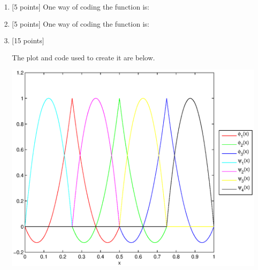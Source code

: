 \begin{solution}
\begin{enumerate}
\item {[5 points]} 
One way of coding the function is:



\item {[5 points]} 
One way of coding the function is:



\item {[15 points]} 

The plot and code used to create it are below.

\begin{center}
\includegraphics[scale=0.7]{hw29c.eps}
\end{center}



\end{enumerate}
\end{solution}

